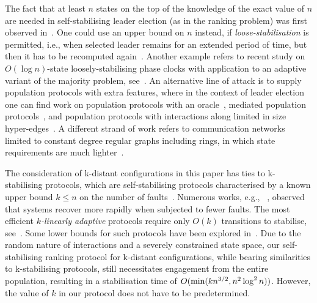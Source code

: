 The fact that at least $n$ states on the top of the knowledge of the exact value of $n$ are needed in self-stabilising leader election (as in the ranking problem) was first observed in~\cite{CIW12}. 
One could use an upper bound on $n$ instead, if {\em loose-stabilisation} is permitted, i.e., when selected leader remains for an extended period of time, but then it has to be recomputed again~\cite{Sudo+20}.
Another example refers to recent study on $O(\log n)$-state loosely-stabilising phase clocks with application to an adaptive variant of the majority problem, see~\cite{BBH+22}. 
An alternative line of attack is to supply population protocols with extra features, where in the context of leader election one can find work on population protocols with an oracle~\cite{BBB13, FJ06}, mediated population protocols~\cite{MOK+12}, and population protocols with interactions along limited in size hyper-edges~\cite{XYK+13}. 
A different strand of work refers to communication networks limited to constant degree regular graphs including rings, in which state requirements are much lighter~\cite{AAF+05,CC19,CC20,YSM20,YSO+23}. 

The consideration of k-distant configurations in this paper has ties to k-stabilising protocols, which are self-stabilising protocols characterised by a known upper bound $k\leq n$ on the number of faults~\cite{BGK99}.
%
Numerous works, e.g., ~\cite{BGK99,GX99,KP97,KP95}, observed that systems 
recover more rapidly when subjected to fewer faults. 
The most efficient {\em $k$-linearly adaptive} protocols require only $O(k)$ transitions to stabilise, see~\cite{BDH06}. 
Some lower bounds for such protocols have been explored in~\cite{GT02}.
%
Due to the random nature of interactions and a severely constrained state space, our self-stabilising ranking protocol for k-distant configurations, while bearing similarities to k-stabilising protocols, still necessitates engagement from the entire population, resulting in a stabilisation time of $O({\rm\/min}(kn^{3/2},n^2\log^2 n))$. However, the value of $k$ in our protocol does not have to be predetermined.

